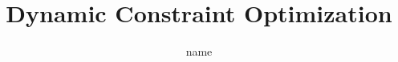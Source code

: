 \documentclass{ddis-thesis}
\author{name}
\title{Dynamic Constraint Optimization}
\begin{document}

\frontmatter






\tableofcontents

\mainmatter













\appendix


\backmatter

\normalfont
\clearpage
\listoffigures

\clearpage
\listoftables
\end{document}
